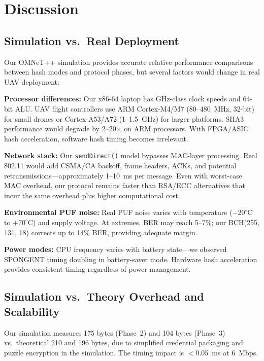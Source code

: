 \documentclass[11pt,a4paper]{article}
\begin{document}
\section{Discussion}
\label{sec:discussion}

\subsection{Simulation vs.\ Real Deployment}

Our OMNeT++ simulation provides accurate relative performance comparisons between hash modes and protocol phases, but several factors would change in real UAV deployment:

\textbf{Processor differences:} Our x86-64 laptop has GHz-class clock speeds and 64-bit ALU. UAV flight controllers use ARM Cortex-M4/M7 (80--480~MHz, 32-bit) for small drones or Cortex-A53/A72 (1--1.5~GHz) for larger platforms. SHA3 performance would degrade by 2--20$\times$ on ARM processors. With FPGA/ASIC hash acceleration, software hash timing becomes irrelevant.

\textbf{Network stack:} Our \texttt{sendDirect()} model bypasses MAC-layer processing. Real 802.11 would add CSMA/CA backoff, frame headers, ACKs, and potential retransmissions---approximately 1--10~ms per message. Even with worst-case MAC overhead, our protocol remains faster than RSA/ECC alternatives that incur the same overhead plus higher computational cost.

\textbf{Environmental PUF noise:} Real PUF noise varies with temperature ($-20^{\circ}$C to $+70^{\circ}$C) and supply voltage. At extremes, BER may reach 5--7\%; our BCH(255, 131, 18) corrects up to 14\% BER, providing adequate margin.

\textbf{Power modes:} CPU frequency varies with battery state---we observed SPONGENT timing doubling in battery-saver mode. Hardware hash acceleration provides consistent timing regardless of power management.

\subsection{Simulation vs.\ Theory Overhead and Scalability}

Our simulation measures 175 bytes (Phase~2) and 104 bytes (Phase~3) vs.\ theoretical 210 and 196 bytes, due to simplified credential packaging and puzzle encryption in the simulation. The timing impact is $<$0.05~ms at 6~Mbps.
\end{document}
